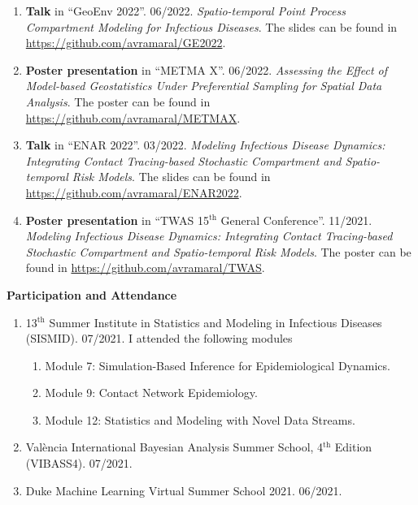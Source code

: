 \documentclass[11pt, ]{article}
\begin{document}
	\begin{enumerate}
		
		
		\item \textbf{Talk} in ``GeoEnv 2022''. 06/2022. \textit{Spatio-temporal Point Process Compartment Modeling for Infectious Diseases}. The slides can be found in \href{https://github.com/avramaral/GE2022}{https://github.com/avramaral/GE2022}.
		
		\item \textbf{Poster presentation} in ``METMA X''. 06/2022. \textit{Assessing the Effect of Model-based Geostatistics Under Preferential Sampling for Spatial Data Analysis}. The poster can be found in \href{https://github.com/avramaral/METMAX}{https://github.com/avramaral/METMAX}.
		
		\item \textbf{Talk} in ``ENAR 2022''. 03/2022. \textit{Modeling Infectious Disease Dynamics: Integrating Contact Tracing-based	Stochastic Compartment and Spatio-temporal Risk Models}. The slides can be found in \href{https://github.com/avramaral/ENAR2022}{https://github.com/avramaral/ENAR2022}.
		
		\item \textbf{Poster presentation} in ``TWAS 15${}^{\text{th}}$ General Conference''. 11/2021. \textit{Modeling Infectious Disease Dynamics: Integrating Contact Tracing-based	Stochastic Compartment and Spatio-temporal Risk Models}. The poster can be found in \href{https://github.com/avramaral/TWAS}{https://github.com/avramaral/TWAS}.
	\end{enumerate}

{\Large \textbf{Participation and Attendance}}

\begin{enumerate}
	\item 13${}^{\text{th}}$ Summer Institute in Statistics and Modeling in Infectious Diseases (SISMID). 07/2021. I attended the following modules \vspace{-6pt}
	\begin{enumerate}[label*=\arabic*., noitemsep]
		\item Module 7: Simulation-Based Inference for Epidemiological Dynamics.
		\item Module 9: Contact Network Epidemiology.
		\item Module 12: Statistics and Modeling with Novel Data Streams.
	\end{enumerate}
	
	\item València International Bayesian Analysis Summer School, 4${}^{\text{th}}$ Edition (VIBASS4). 07/2021.
	
	\item Duke Machine Learning Virtual Summer School 2021. 06/2021.
\end{enumerate}

\vspace{6pt}
\end{document}

